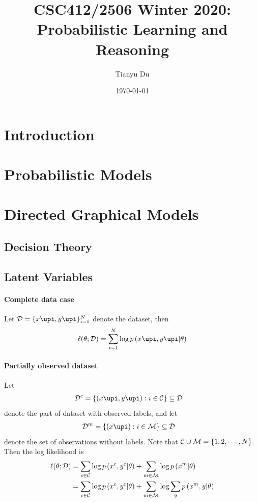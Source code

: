 \documentclass{article}
\title{CSC412/2506 Winter 2020: Probabilistic Learning and Reasoning}
\date{\today}
\author{Tianyu Du}
\begin{document}
    \maketitle
    \tableofcontents
    \newpage
    \section{Introduction}
    
    \section{Probabilistic Models}
	
	\section{Directed Graphical Models}
	\subsection{Decision Theory}
	
	\subsection{Latent Variables}
	\paragraph{Complete data case} Let $\mc{D} = \{x\upi, y\upi\}_{i=1}^N$ denote the dataset, then
	\begin{align}
		\ell(\theta ; \mathcal{D})=\sum_{i=1}^N \log p\left(x\upi, y\upi | \theta\right)
	\end{align}
	\paragraph{Partially observed dataset} Let
	\begin{align}
		\mc{D}^c &= \{(x\upi, y\upi): i \in \mc{C}\} \subseteq \mc{D}
	\end{align}
	denote the part of dataset with observed labels, and let
	\begin{align}
		\mc{D}^m &= \{(x\upi): i \in \mc{M}\} \subseteq \mc{D}
	\end{align}
	denote the set of observations without labels. Note that $\mathcal{{C}} \cup \mathcal{{M}} = \{1, 2, \cdots, N\}$. \\
	Then the log likelihood is
	\begin{align}
		\ell(\theta ; \mathcal{D})
		&= \sum_{c \in \mathcal{{C}}} \log p\left(x^{c}, y^{c} | \theta\right)
		+ \sum_{m \in \mathcal{{M}}} \log p\left(x^{m} | \theta\right) \\
		&=\sum_{c \in \mathcal{{C}}} \log p\left(x^{c}, y^{c} | \theta\right)
		+ \sum_{m \in \mathcal{{M}}} \log \sum_{y} p\left(x^{m}, y | \theta\right)
	\end{align}
\end{document}
